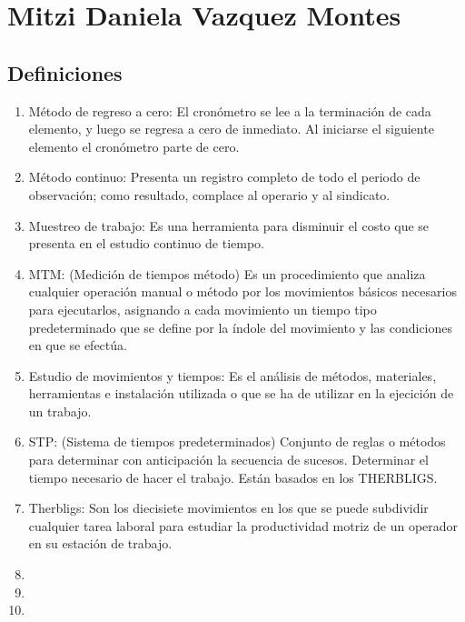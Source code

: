 \section{Mitzi Daniela Vazquez Montes}
\subsection{Definiciones}
\begin{enumerate}
    \item Método de regreso a cero: El cronómetro se lee a la terminación de cada elemento, y luego se regresa a cero de inmediato. Al iniciarse el siguiente elemento el cronómetro parte de cero.
    \item Método continuo: Presenta un registro completo de todo el periodo de observación; como resultado, complace al operario y al sindicato.
    \item Muestreo de trabajo: Es una herramienta para disminuir el costo que se presenta en el estudio continuo de tiempo.
    \item MTM: (Medición de tiempos método) Es un procedimiento que analiza cualquier operación manual o método por los movimientos básicos necesarios para ejecutarlos, asignando a cada movimiento un tiempo tipo predeterminado que se define por la índole del movimiento y las condiciones en que se efectúa.
    \item Estudio de movimientos y tiempos: Es el análisis de métodos, materiales, herramientas e instalación utilizada o que se ha de utilizar en la ejecición de un trabajo.
    \item STP: (Sistema de tiempos predeterminados) Conjunto de reglas o métodos para determinar con anticipación la secuencia de sucesos. Determinar el tiempo necesario de hacer el trabajo. Están basados en los THERBLIGS.
    \item Therbligs: Son los diecisiete movimientos en los que se puede subdividir cualquier tarea laboral para estudiar la productividad motriz de un operador en su estación de trabajo.
    \item 
    \item 
    \item 
    
\end{enumerate}